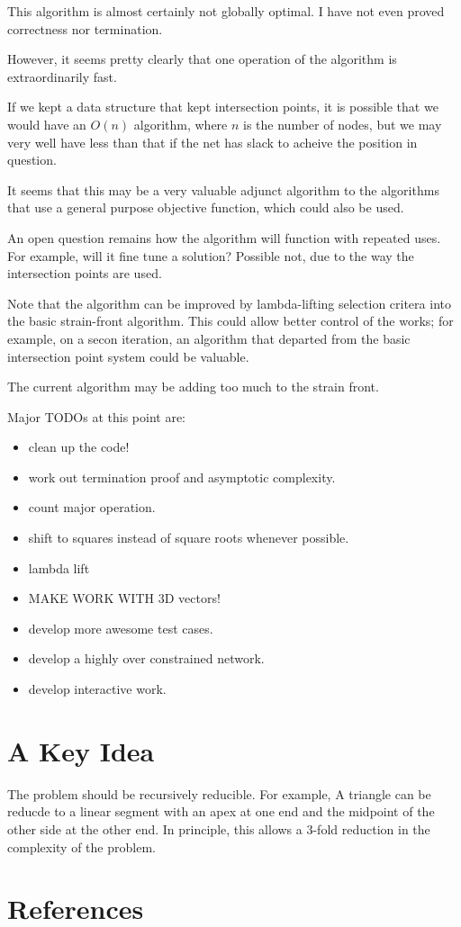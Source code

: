 \documentclass[11pt]{article}
\begin{document}
This algorithm is almost certainly not globally optimal.  I have not even proved correctness
nor termination.

However, it seems pretty clearly that one operation of the algorithm is extraordinarily fast.

If we kept a data structure that kept intersection points, it is possible that we would
have an $O(n)$ algorithm, where $n$ is the number of nodes, but we may very well have
less than that if the net has slack to acheive the position in question.

It seems that this may be a very valuable adjunct algorithm to the algorithms that
use a general purpose objective function, which could also be used.

An open question remains how the algorithm will function with repeated uses.
For example, will it fine tune a solution?  Possible not, due to the way the
intersection points are used.

Note that the algorithm can be improved by lambda-lifting selection critera into
the basic strain-front algorithm. This could allow better control of the  works;
for example, on a secon iteration, an algorithm that departed from the basic
intersection point system could be valuable.

The current algorithm may be adding too much to the strain front.

Major TODOs at this point are:
\begin{itemize}
\item clean up the code!
\item work out termination proof and asymptotic complexity.
\item count major operation.
\item shift to squares instead of square roots whenever possible.
\item lambda lift
\item MAKE WORK WITH 3D vectors!
\item develop more awesome test cases.
  \item develop a highly over constrained network.
  \item develop interactive work.
  \end{itemize}

\section{A Key Idea}

The problem should be recursively reducible. For example, A triangle can
be reducde to a linear segment with an apex at one end and the midpoint of the
other side at the other end.  In principle, this allows a 3-fold reduction
in the complexity of the problem.


\section{References}
\end{document}
